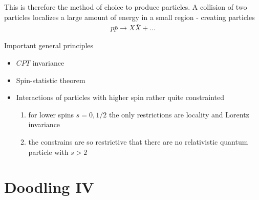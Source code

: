 \documentclass[10pt,a4paper]{book}
\theoremstyle{definition}
\begin{document}
This is therefore the method of choice to produce particles. A collision of two particles localizes a large amount of energy in a small region - creating particles
\begin{align}
    p\bar{p}\rightarrow X\bar{X}+ ...
\end{align}

Important general principles
\begin{itemize}
    \item $CPT$ invariance
    \item Spin-statistic theorem
    \item Interactions of particles with higher spin rather quite constrainted
    \begin{enumerate}
        \item for lower spins $s=0, 1/2$ the only restrictions are locality and Lorentz invariance
        \item the constrains are so restrictive that there are no relativistic quantum particle with $s>2$
    \end{enumerate}
\end{itemize}

\newpage
\chapter{Doodling IV} %
\end{document}
